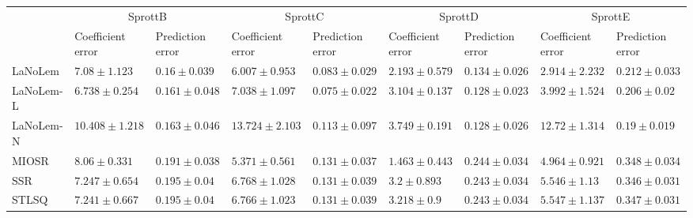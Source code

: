 \begin{table*}
{\begin{tabular}{lllllllll}
 & \multicolumn{2}{c}{SprottB} & \multicolumn{2}{c}{SprottC} & \multicolumn{2}{c}{SprottD} & \multicolumn{2}{c}{SprottE} \\
 & Coefficient error & Prediction error & Coefficient error & Prediction error & Coefficient error & Prediction error & Coefficient error & Prediction error \\
\midrule
LaNoLem & $7.08\pm 1.123$ & $\mathbf{0.16}\pm 0.039$ & $6.007\pm 0.953$ & $0.083\pm 0.029$ & $2.193\pm 0.579$ & $0.134\pm 0.026$ & $\mathbf{2.914}\pm 2.232$ & $0.212\pm 0.033$ \\
LaNoLem-L & $\mathbf{6.738}\pm 0.254$ & $0.161\pm 0.048$ & $7.038\pm 1.097$ & $\mathbf{0.075}\pm 0.022$ & $3.104\pm 0.137$ & $\mathbf{0.128}\pm 0.023$ & $3.992\pm 1.524$ & $0.206\pm 0.02$ \\
LaNoLem-N & $10.408\pm 1.218$ & $0.163\pm 0.046$ & $13.724\pm 2.103$ & $0.113\pm 0.097$ & $3.749\pm 0.191$ & $0.128\pm 0.026$ & $12.72\pm 1.314$ & $\mathbf{0.19}\pm 0.019$ \\
MIOSR & $8.06\pm 0.331$ & $0.191\pm 0.038$ & $\mathbf{5.371}\pm 0.561$ & $0.131\pm 0.037$ & $\mathbf{1.463}\pm 0.443$ & $0.244\pm 0.034$ & $4.964\pm 0.921$ & $0.348\pm 0.034$ \\
SSR & $7.247\pm 0.654$ & $0.195\pm 0.04$ & $6.768\pm 1.028$ & $0.131\pm 0.039$ & $3.2\pm 0.893$ & $0.243\pm 0.034$ & $5.546\pm 1.13$ & $0.346\pm 0.031$ \\
STLSQ & $7.241\pm 0.667$ & $0.195\pm 0.04$ & $6.766\pm 1.023$ & $0.131\pm 0.039$ & $3.218\pm 0.9$ & $0.243\pm 0.034$ & $5.547\pm 1.137$ & $0.347\pm 0.031$ \\

\midrule


\end{tabular}}
\end{table*}
